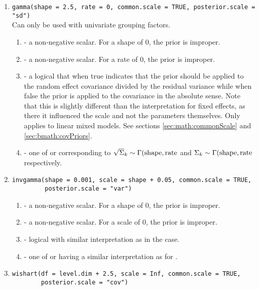 \documentclass[article,shortnames]{jss}
\begin{document}
\begin{enumerate}
\item
\verb?gamma(shape = 2.5, rate = 0, common.scale = TRUE, posterior.scale = "sd")?\\  Can only be used with univariate grouping factors.
  \begin{enumerate}
  \item {} - a non-negative scalar. For a shape of 0, the
    prior is improper.
  \item {} - a non-negative scalar. For a rate of 0, the
    prior is improper.
  \item {} - a logical that when true indicates that
    the prior should be applied to the random effect covariance divided by
    the residual variance while when false the prior is applied to the covariance
    in the absolute sense. Note that this is slightly different than
    the interpretation for fixed effects, as there it influenced the
    scale and not the parameters themselves. Only applies to linear
    mixed models. See sections
    \ref{sec:math:commonScale} and \ref{sec:bmath:covPriors}.
  \item {} - one of  or 
    corresponding to $\sqrt\Sigma_k \sim \Gamma({\rm shape}, {\rm rate}$
    and $\Sigma_k \sim \Gamma({\rm shape}, {\rm rate}$ respectively.
  \end{enumerate}
\item
\verb?invgamma(shape = 0.001, scale = shape + 0.05, common.scale = TRUE,?\\
\verb?         posterior.scale = "var")?  \begin{enumerate}
  \item {} - a non-negative scalar. For a shape of 0, the
    prior is improper.
  \item {} - a non-negative scalar. For a scale of 0, the
    prior is improper.
  \item {} - logical with similar interpretation as
    in the  case.
  \item {} - one of  or 
    having a similar interpretation as for .
  \end{enumerate}
\item
\verb?wishart(df = level.dim + 2.5, scale = Inf, common.scale = TRUE,?\\
\verb?        posterior.scale = "cov")?\begin{enumerate}

\end{enumerate}
\end{enumerate}
\end{document}
